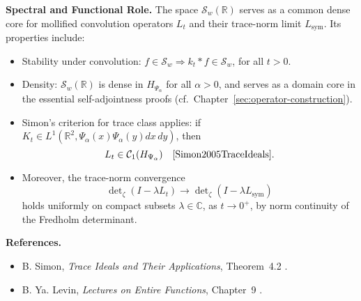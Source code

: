 \begin{definition}
\medskip
\noindent\textbf{Spectral and Functional Role.}
The space \( \mathcal{S}_w(\mathbb{R}) \) serves as a common dense core for mollified convolution operators \( L_t \) and their trace-norm limit \( L_{\mathrm{sym}} \). Its properties include:
\begin{itemize}
    \item Stability under convolution: \( f \in \mathcal{S}_w \Rightarrow k_t * f \in \mathcal{S}_w \), for all \( t > 0 \).
    \item Density: \( \mathcal{S}_w(\mathbb{R}) \) is dense in \( H_{\Psi_\alpha} \) for all \( \alpha > 0 \), and serves as a domain core in the essential self-adjointness proofs (cf.~Chapter~\ref{sec:operator-construction}).
    \item Simon’s criterion for trace class applies: if \( K_t \in L^1(\mathbb{R}^2, \Psi_\alpha(x)\Psi_\alpha(y) dx\,dy) \), then
    \[
    L_t \in \mathcal{C}_1(H_{\Psi_\alpha}) \quad \text{\cite[Thm.~4.2]{Simon2005TraceIdeals}}.
    \]
    \item Moreover, the trace-norm convergence
    \[
    \det\nolimits_\zeta(I - \lambda L_t) \to \det\nolimits_\zeta(I - \lambda L_{\mathrm{sym}})
    \]
    holds uniformly on compact subsets \( \lambda \in \mathbb{C} \), as \( t \to 0^+ \), by norm continuity of the Fredholm determinant.
\end{itemize}

\medskip
\noindent\textbf{References.}
\begin{itemize}
    \item B. Simon, \emph{Trace Ideals and Their Applications}, Theorem~4.2 \cite{Simon2005TraceIdeals}.
    \item B. Ya. Levin, \emph{Lectures on Entire Functions}, Chapter~9 \cite{Levin1996EntireLectures}.
\end{itemize}
\end{definition}

